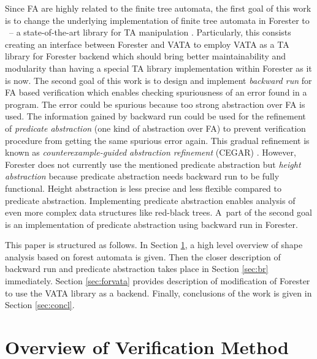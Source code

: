 \documentclass[fleqn,11pt]{ExcelAtFIT} %
\begin{document}
Since FA are highly related to the finite tree automata, the first goal of this work is to change
the underlying implementation of finite tree automata in Forester to \vata\ -- a state-of-the-art library for TA manipulation \cite{libvata}.
Particularly, this consists creating an interface between Forester and VATA to employ VATA as a TA library for Forester backend
which should bring better maintainability and modularity than having a special TA library implementation within Forester as it is now.
The second goal of this work is to design and implement \emph{backward run} for FA based verification
which enables checking spuriousness of an error found in a program.
The error could be spurious because too strong abstraction over FA is used.
The information gained by backward run could be used for the refinement of \emph{predicate abstraction} (one kind of abstraction over FA)
to prevent verification procedure from getting the same spurious error again.
This gradual refinement is known as \emph{counterexample-guided abstraction refinement} (CEGAR) \cite{cegar}.
However, Forester does not currently use the mentioned predicate abstraction but \emph{height abstraction} %
because predicate abstraction needs backward run to be fully functional.
Height abstraction is less precise and less flexible compared to predicate abstraction.
Implementing predicate abstraction enables analysis of even more complex data structures like red-black trees.
A~part of the second goal is an implementation of predicate abstraction using backward run in Forester.

This paper is structured as follows.
In Section \ref{sec:overview}, a high level overview of shape analysis based on forest automata
is given.
Then the closer description of backward run and predicate abstraction takes place in Section \ref{sec:br}
immediately.
Section \ref{sec:forvata} provides description of modification of Forester to use the VATA library as a backend.
Finally, conclusions of the work is given in Section \ref{sec:concl}.

\section{Overview of Verification Method}
\label{sec:overview}
\end{document}
